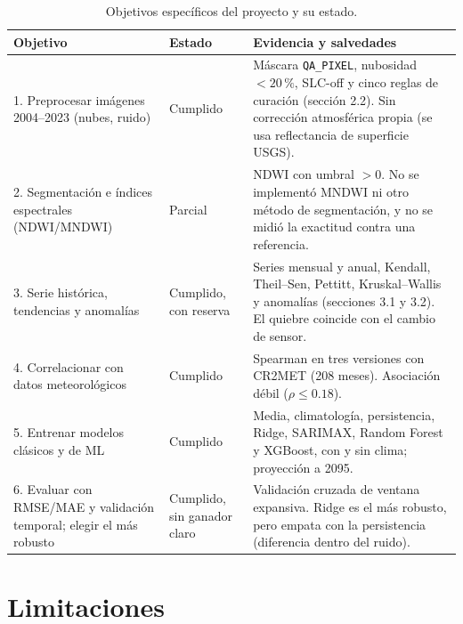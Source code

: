 \documentclass[11pt,a4paper]{article}
\begin{document}
\begin{table}[H]
\centering
\caption{Objetivos específicos del proyecto y su estado.}
\label{tab:obj}
\small
\begin{tabular}{p{4.4cm}p{2.7cm}p{7.2cm}}
\toprule
Objetivo & Estado & Evidencia y salvedades \\
\midrule
1. Preprocesar imágenes 2004--2023 (nubes, ruido) & Cumplido & Máscara \texttt{QA\_PIXEL}, nubosidad $<20\,\%$, SLC-off y cinco reglas de curación (sección 2.2). Sin corrección atmosférica propia (se usa reflectancia de superficie USGS). \\
2. Segmentación e índices espectrales (NDWI/MNDWI) & Parcial & NDWI con umbral $>0$. No se implementó MNDWI ni otro método de segmentación, y no se midió la exactitud contra una referencia. \\
3. Serie histórica, tendencias y anomalías & Cumplido, con reserva & Series mensual y anual, Kendall, Theil--Sen, Pettitt, Kruskal--Wallis y anomalías (secciones 3.1 y 3.2). El quiebre coincide con el cambio de sensor. \\
4. Correlacionar con datos meteorológicos & Cumplido & Spearman en tres versiones con CR2MET (208 meses). Asociación débil ($\rho\le0.18$). \\
5. Entrenar modelos clásicos y de ML & Cumplido & Media, climatología, persistencia, Ridge, SARIMAX, Random Forest y XGBoost, con y sin clima; proyección a 2095. \\
6. Evaluar con RMSE/MAE y validación temporal; elegir el más robusto & Cumplido, sin ganador claro & Validación cruzada de ventana expansiva. Ridge es el más robusto, pero empata con la persistencia (diferencia dentro del ruido). \\
\bottomrule
\end{tabular}
\end{table}


\section{Limitaciones}
\end{document}
